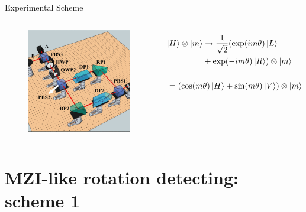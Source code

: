 \documentclass[amssymb, amsmath]{beamer}
\begin{document}
\begin{frame}{Experimental Scheme}

\begin{columns}

\begin{figure}
    \centering
    \includegraphics[width=1.00\textwidth]{fig/scheme_clipped.png}
\end{figure}

\begin{align}
    \ket{H}\otimes\ket{m} &\to \frac{1}{\sqrt{2}}(\exp(i m \theta)\ket{L}\nonumber\\
    &+ \exp(-i m \theta)\ket{R})\otimes\ket{m} \\\nonumber\\
    = (\cos(m & \theta)\ket{H}+\sin(m \theta)\ket{V})\otimes\ket{m}
\end{align}

\end{columns}
\end{frame}

\section{MZI-like rotation detecting: scheme 1}
\end{document}
